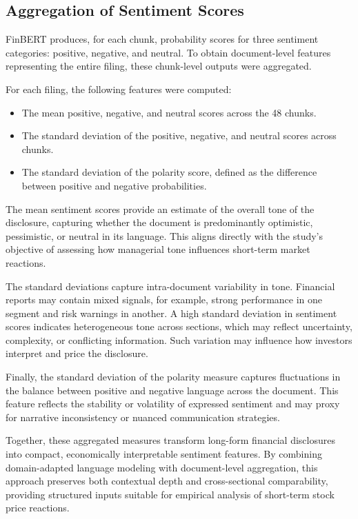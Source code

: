 \subsection*{Aggregation of Sentiment Scores}

FinBERT produces, for each chunk, probability scores for three sentiment categories: positive, negative, and neutral. 
To obtain document-level features representing the entire filing, these chunk-level outputs were aggregated.

For each filing, the following features were computed:
\begin{itemize}
    \item The mean positive, negative, and neutral scores across the 48 chunks.
	\item The standard deviation of the positive, negative, and neutral scores across chunks.
    \item The standard deviation of the polarity score, defined as the difference between positive and negative probabilities.
\end{itemize}

The mean sentiment scores provide an estimate of the overall tone of the disclosure, capturing whether the document is predominantly optimistic, pessimistic, or neutral in its language. 
This aligns directly with the study's objective of assessing how managerial tone influences short-term market reactions.

The standard deviations capture intra-document variability in tone. 
Financial reports may contain mixed signals, for example, strong performance in one segment and risk warnings in another. 
A high standard deviation in sentiment scores indicates heterogeneous tone across sections, which may reflect uncertainty, complexity, or conflicting information. 
Such variation may influence how investors interpret and price the disclosure.

Finally, the standard deviation of the polarity measure captures fluctuations in the balance between positive and negative language across the document. 
This feature reflects the stability or volatility of expressed sentiment and may proxy for narrative inconsistency or nuanced communication strategies.

Together, these aggregated measures transform long-form financial disclosures into compact, economically interpretable sentiment features. 
By combining domain-adapted language modeling with document-level aggregation, this approach preserves both contextual depth and cross-sectional comparability, providing structured inputs suitable for empirical analysis of short-term stock price reactions.

